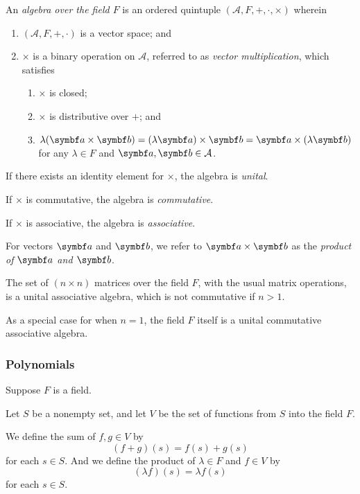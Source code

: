\Bdf
  An \emph{algebra over the field \(F\)} is an ordered quintuple \((\mathcal{A}, F, +, \cdot, \times)\) wherein
  \begin{enumerate}
    \item \((\mathcal{A}, F, +, \cdot)\) is a vector space; and
    \item \(\times\) is a binary operation on \(\mathcal{A}\), referred to as \emph{vector multiplication}, which
    satisfies
    \begin{enumerate}
      \item \(\times\) is closed;
      \item \(\times\) is distributive over \(+\); and
      \item \(\lambda (\vct{a} \times \vct{b}) = (\lambda \vct{a}) \times \vct{b} = \vct{a} \times (\lambda \vct{b})\)
      for any \(\lambda \in F\) and \(\vct{a}, \vct{b} \in \mathcal{A}\).
    \end{enumerate}
  \end{enumerate}

  If there exists an identity element for \(\times\), the algebra is \emph{unital}.

  If \(\times\) is commutative, the algebra is \emph{commutative}.

  If \(\times\) is associative, the algebra is \emph{associative}.

  For vectors \(\vct{a}\) and \(\vct{b}\), we refer to \(\vct{a} \times \vct{b}\) as the \emph{product of \(\vct{a}\)
  and \(\vct{b}\)}.
\Edf

\Bxm
  The set of \((n \times n)\) matrices over the field \(F\), with the usual matrix operations, is a unital associative
  algebra, which is not commutative if \(n > 1\).

  As a special case for when \(n = 1\), the field \(F\) itself is a unital commutative associative algebra.
\Exm

\subsubsection{Polynomials}

Suppose \(F\) is a field.

\Bxm
  Let \(S\) be a nonempty set, and let \(V\) be the set of functions from \(S\) into the field \(F\).

  We define the sum of \(f, g \in V\) by
  \[
    (f + g)(s) = f(s) + g(s)
  \]
  for each \(s \in S\). And we define the product of \(\lambda \in F\) and \(f \in V\) by
  \[
    (\lambda f)(s) = \lambda f(s)
  \]
  for each \(s \in S\).
  
